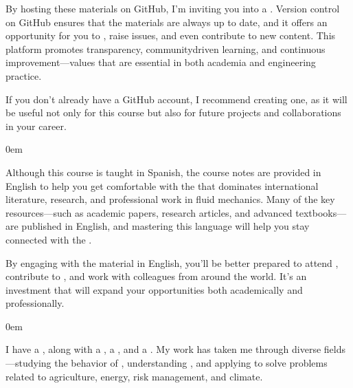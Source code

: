 \documentclass[letterpaper,10pt,english]{jupyterBook}
\begin{document}
\sphinxAtStartPar
By hosting these materials on GitHub, I’m inviting you into a . Version control on GitHub ensures that the materials are always up to date, and it offers an opportunity for you to , raise issues, and even contribute to new content. This platform promotes transparency, community\sphinxhyphen{}driven learning, and continuous improvement—values that are essential in both academia and engineering practice.

\sphinxAtStartPar
If you don’t already have a GitHub account, I recommend creating one, as it will be useful not only for this course but also for future projects and collaborations in your career.

\begin{DUlineblock}{0em}
\item[] 
\end{DUlineblock}

\sphinxAtStartPar
Although this course is taught in Spanish, the course notes are provided in English to help you get comfortable with the  that dominates international literature, research, and professional work in fluid mechanics. Many of the key resources—such as academic papers, research articles, and advanced textbooks—are published in English, and mastering this language will help you stay connected with the .

\sphinxAtStartPar
By engaging with the material in English, you’ll be better prepared to attend , contribute to , and work with colleagues from around the world. It’s an investment that will expand your opportunities both academically and professionally.

\begin{DUlineblock}{0em}
\item[] 
\end{DUlineblock}

\sphinxAtStartPar
I have a , along with a , a , and a . My work has taken me through diverse fields—studying the behavior of , understanding , and applying  to solve problems related to agriculture, energy, risk management, and climate.
\end{document}
